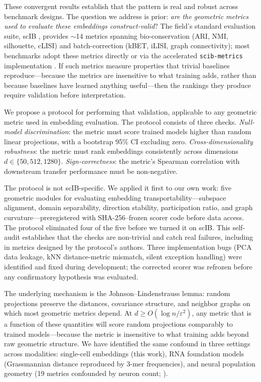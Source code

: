\documentclass[10pt,letterpaper]{article}
\begin{document}
These convergent results establish that the pattern is real and robust across benchmark designs. The question we address is prior: \emph{are the geometric metrics used to evaluate these embeddings construct-valid}? The field's standard evaluation suite, scIB \citep{luecken2022scib}, provides $\sim$14 metrics spanning bio-conservation (ARI, NMI, silhouette, cLISI) and batch-correction (kBET, iLISI, graph connectivity); most benchmarks adopt these metrics directly or via the accelerated \texttt{scib-metrics} implementation \citep{scibmetrics2023}. If such metrics measure properties that trivial baselines reproduce---because the metrics are insensitive to what training adds, rather than because baselines have learned anything useful---then the rankings they produce require validation before interpretation.

We propose a protocol for performing that validation, applicable to any geometric metric used in embedding evaluation. The protocol consists of three checks. \emph{Null-model discrimination}: the metric must score trained models higher than random linear projections, with a bootstrap 95\% CI excluding zero. \emph{Cross-dimensionality robustness}: the metric must rank embeddings consistently across dimensions $d \in \{50, 512, 1280\}$. \emph{Sign-correctness}: the metric's Spearman correlation with downstream transfer performance must be non-negative.

The protocol is not scIB-specific. We applied it first to our own work: five geometric modules for evaluating embedding transportability---subspace alignment, domain separability, direction stability, participation ratio, and graph curvature---preregistered with SHA-256--frozen scorer code before data access. The protocol eliminated four of the five before we turned it on scIB. This self-audit establishes that the checks are non-trivial and catch real failures, including in metrics designed by the protocol's authors. Three implementation bugs (PCA data leakage, kNN distance-metric mismatch, silent exception handling) were identified and fixed during development; the corrected scorer was refrozen before any confirmatory hypothesis was evaluated.

The underlying mechanism is the Johnson--Lindenstrauss lemma: random projections preserve the distances, covariance structure, and neighbor graphs on which most geometric metrics depend. At $d \geq O(\log n / \varepsilon^2)$, any metric that is a function of these quantities will score random projections comparably to trained models---because the metric is insensitive to what training adds beyond raw geometric structure. We have identified the same confound in three settings across modalities: single-cell embeddings (this work), RNA foundation models (Grassmannian distance reproduced by 3-mer frequencies), and neural population geometry (19 metrics confounded by neuron count; \citealp{tower2026bracket}).
\end{document}
